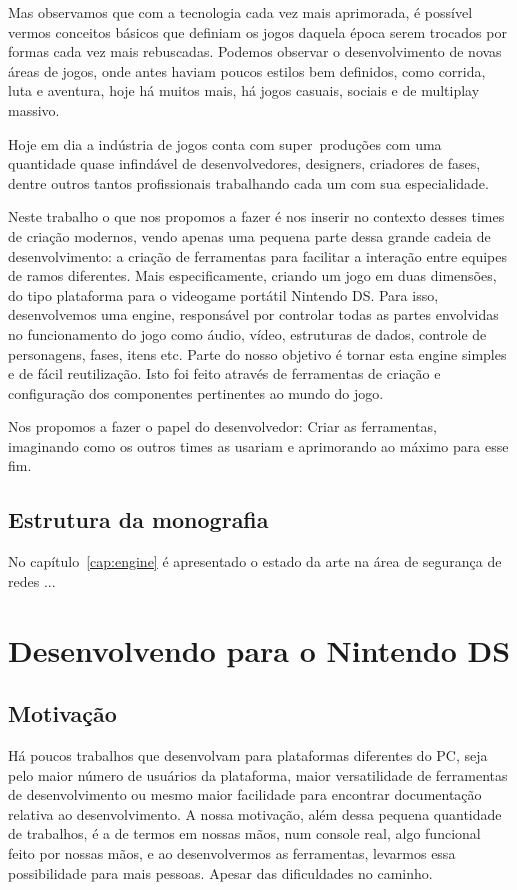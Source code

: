 \documentclass[brazil]{abnt}
\begin{document}
Mas observamos que com a tecnologia cada vez mais aprimorada, é possível vermos conceitos básicos que definiam os jogos daquela época serem trocados por formas cada vez mais rebuscadas. Podemos observar o desenvolvimento de novas áreas de jogos, onde antes haviam poucos estilos bem definidos, como corrida, luta e aventura, hoje há muitos mais, há jogos casuais, sociais e de multiplay massivo.

Hoje em dia a indústria de jogos conta com super~produções com uma quantidade quase infindável de desenvolvedores, designers, criadores de fases, dentre outros tantos profissionais trabalhando cada um com sua especialidade.

Neste trabalho o que nos propomos a fazer é nos inserir no contexto desses times de criação modernos, vendo apenas uma pequena parte dessa grande cadeia de desenvolvimento: a criação de ferramentas para facilitar a interação entre equipes de ramos diferentes. Mais especificamente, criando um jogo em duas dimensões, do tipo plataforma para o videogame portátil Nintendo DS. Para isso, desenvolvemos uma engine, responsável por controlar todas as partes envolvidas no funcionamento do jogo como áudio, vídeo, estruturas de dados, controle de personagens, fases, itens etc. Parte do nosso objetivo é tornar esta engine  simples e de fácil reutilização. Isto foi feito através de ferramentas de criação e configuração dos componentes pertinentes ao mundo do jogo.

Nos propomos a fazer o papel do desenvolvedor: Criar as ferramentas, imaginando como os outros times as usariam e aprimorando ao máximo para esse fim.

\section{Estrutura da monografia}

No capítulo~\ref{cap:engine} é apresentado o estado da arte
na área de segurança de redes ...

\chapter{Desenvolvendo para o Nintendo DS\label{cap:hardds}}

\section{Motivação}

Há poucos trabalhos que desenvolvam para plataformas diferentes do PC, seja pelo maior número de usuários da plataforma, maior versatilidade de ferramentas de desenvolvimento ou mesmo maior facilidade para encontrar documentação relativa ao desenvolvimento. A nossa motivação, além dessa pequena quantidade de trabalhos, é a de termos em nossas mãos, num console real, algo funcional feito por nossas mãos, e ao desenvolvermos as ferramentas, levarmos essa possibilidade para mais pessoas. Apesar das dificuldades no caminho.
\end{document}
